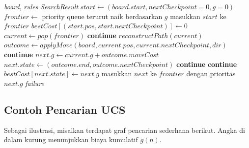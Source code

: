 \begin{algorithm}[H]
    \caption{Uniform Cost Search (UCS) pada Solver}
    \begin{algorithmic}[1]
        \Require \textit{board}, \textit{rules}
        \Ensure \textit{SearchResult}
        \State $start \gets (board.start, nextCheckpoint=0, g=0)$
        \State $frontier \gets$ priority queue terurut naik berdasarkan $g$
        \State masukkan $start$ ke $frontier$
        \State $bestCost[(start.pos, start.nextCheckpoint)] \gets 0$
        \State $current \gets pop(frontier)$
        \State \textbf{continue}
        \EndIf
        \State \Return $reconstructPath(current)$
        \EndIf
        \State $outcome \gets applyMove(board, current.pos, current.nextCheckpoint, dir)$
        \State \textbf{continue}
        \EndIf
        \State $next.g \gets current.g + outcome.moveCost$
        \State $next.state \gets (outcome.end, outcome.nextCheckpoint)$
        \State \textbf{continue}
        \EndIf
        \State \textbf{continue}
        \EndIf
        \State $bestCost[next.state] \gets next.g$
        \State masukkan $next$ ke $frontier$ dengan prioritas $next.g$
        \EndFor
        \EndWhile
        \State \Return \textit{failure}
    \end{algorithmic}
\end{algorithm}

\subsection{Contoh Pencarian UCS}
Sebagai ilustrasi, misalkan terdapat graf pencarian sederhana berikut. Angka di dalam kurung menunjukkan biaya kumulatif $g(n)$.

